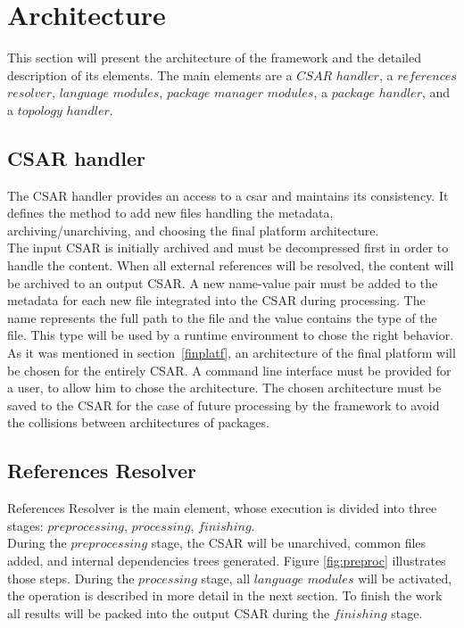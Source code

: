 \section{Architecture}\label{sec:arch}
This section will present the architecture of the framework and the detailed description of its elements.
The main elements are a \boldmath $CSAR$ $handler$, a $references$ $resolver$, $language$ $modules$, $package$ $manager$ $modules$, a $package$ $handler$, and a $topology$ $handler$. \unboldmath

\subsection{CSAR handler} \label{subs:casr_h}
The CSAR handler provides an access to a \gls{csar} and maintains its consistency. 
It defines the method to add new files handling the metadata, \mbox{archiving/unarchiving}, and choosing the final platform architecture. \\
The input CSAR is initially archived and must be decompressed first in order to handle the content.
When all external references will be resolved, the content will be archived to an output CSAR.
A new name-value pair must be added to the metadata for each new file integrated into the CSAR during processing. 
The name represents the full path to the file and the value contains the type of the file. 
This type will be used by a runtime environment to chose the right behavior. %
As it was mentioned in section~\ref{finplatf}, an architecture of the final platform will be chosen for the entirely CSAR.
A command line interface must be provided for a user, to allow him to chose the architecture. 
The chosen architecture must be saved to the CSAR for the case of future processing by the framework to avoid the collisions between architectures of packages.

\subsection{References Resolver} \label{subs:RR}
References Resolver is the main element, whose execution is divided into three stages: $preprocessing$, $processing$, $finishing$. \\
During the $preprocessing$ stage, the CSAR will be unarchived, common files added, and internal dependencies trees generated.
Figure \ref{fig:preproc} illustrates those steps.
During the $processing$ stage, all $language$ $modules$ will be activated, the operation is described in more detail in the next section. %
To finish the work all results will be packed into the output CSAR during the $finishing$ stage.


